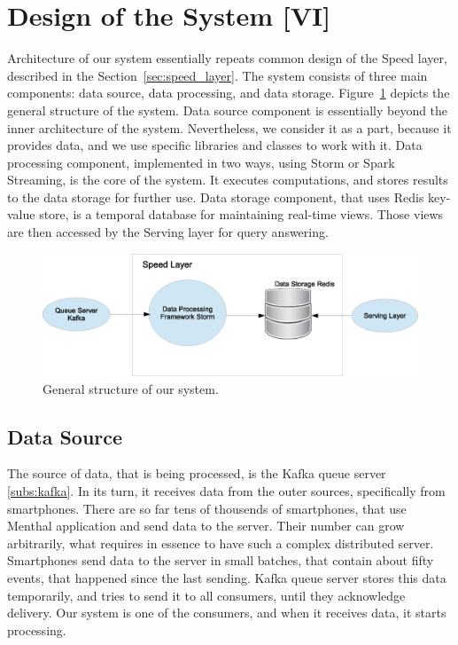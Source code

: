 \section{Design of the System [VI]}

Architecture of our system essentially repeats common design of the Speed layer, described in the Section~\ref{sec:speed_layer}.
The system consists of three main components: data source, data processing, and data storage.
Figure~\ref{fig:SpeedLayerArchitecture} depicts the general structure of the system.
Data source component is essentially beyond the inner architecture of the system.
Nevertheless, we consider it as a part, because it provides data, and we use specific libraries and classes to work with it.
Data processing component, implemented in two ways, using Storm or Spark Streaming, is the core of the system.
It executes computations, and stores results to the data storage for further use.
Data storage component, that uses Redis key-value store, is a temporal database for maintaining real-time views.
Those views are then accessed by the Serving layer for query answering.

\begin{figure}[h]
  \centering
  \includegraphics [width=1.0\textwidth]{images/SpeedLayerArchitecture}
  \caption{General structure of our system.}
  \label{fig:SpeedLayerArchitecture}
\end{figure}

\subsection{Data Source}

The source of data, that is being processed, is the Kafka queue server \ref{subs:kafka}.
In its turn, it receives data from the outer sources, specifically from smartphones.
There are so far tens of thousends of smartphones, that use Menthal application and send data to the server.
Their number can grow arbitrarily, what requires in essence to have such a complex distributed server.
Smartphones send data to the server in small batches, that contain about fifty events, that happened since the last sending.
Kafka queue server stores this data temporarily, and tries to send it to all consumers, until they acknowledge delivery.
Our system is one of the consumers, and when it receives data, it starts processing. 

